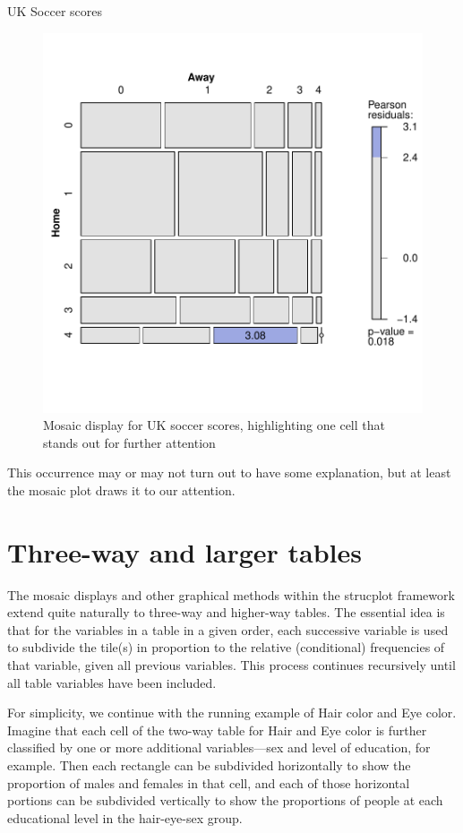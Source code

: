 \documentclass[11pt]{book}\usepackage[]{graphicx}\usepackage[]{color}
\newenvironment{knitrout}{}{} %
\renewenvironment{knitrout}{\small\renewcommand{\baselinestretch}{.85}}{} %
\begin{document}
\begin{Example}[soccer2]{UK Soccer scores}
\begin{knitrout}
\begin{figure}[htbp]
\centerline{\includegraphics[width=.6\textwidth]{ch05/fig/UKsoccer-mosaic} }

\caption[Mosaic display for UK soccer scores, highlighting one cell that stands out for further attention]{Mosaic display for UK soccer scores, highlighting one cell that stands out for further attention\label{fig:UKsoccer-mosaic}}
\end{figure}


\end{knitrout}

This occurrence may or may not turn out to have some explanation, but at least 
the mosaic plot draws it to our attention.
\end{Example}



\section{Three-way and larger tables}\label{sec:mosaic-threeway}


The mosaic displays and other graphical methods within the strucplot framework
extend quite naturally to three-way and higher-way tables.
The essential idea is that for the variables in a \mway table in a given order,
each successive variable is used to subdivide the tile(s) in proportion to
the relative (conditional) frequencies of that variable, given all previous
variables.  This process continues recursively until all table variables
have been included.

For simplicity, we continue with the running example of Hair color and Eye color.
Imagine that each
cell of the two-way table for Hair and Eye color is further
classified by one or more additional variables---sex and level of
education, for example.  Then each rectangle can be subdivided
horizontally to show the proportion of males and females in that
cell, and each of those horizontal portions can be subdivided
vertically to show the proportions of people at each educational
level in the hair-eye-sex group.
\end{document}
